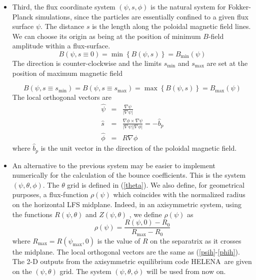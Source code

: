 \documentclass{article}
\begin{document}
\begin{itemize}
\item  Third, the flux coordinate system $\left( \psi ,s,\phi \right) $ is
the natural system for Fokker-Planck simulations, since the particles are
essentially confined to a given flux surface $\psi $. The distance $s$ is
the length along the poloidal magnetic field lines. We can choose its origin
as being at the position of minimum $B$-field amplitude within a
flux-surface. 
\begin{equation}
B\left( \psi ,s\equiv 0\right) =\min \left\{ B\left( \psi ,s\right) \right\}
=B_{\min }\left( \psi \right) 
\end{equation}
The direction is counter-clockwise and the limits $s_{\min }$ and $s_{\max }$
are set at the position of maximum magnetic field

\begin{equation}
B\left( \psi ,s\equiv s_{\min }\right) =B\left( \psi ,s\equiv s_{\max
}\right) =\max \left\{ B\left( \psi ,s\right) \right\} =B_{\max }\left( \psi
\right)   \label{bmax}
\end{equation}
The local orthogonal vectors are 
\begin{eqnarray}
\widehat{\psi } &=&\frac{\nabla \psi }{\left| \nabla \psi \right| }
\label{psih} \\
\widehat{s} &=&\frac{\nabla \phi \times \nabla \psi }{\left| \nabla \psi
\right| \left| \nabla \phi \right| }=-\widehat{b}_{p} \\
\widehat{\phi } &=&R\nabla \phi   \label{phih}
\end{eqnarray}
where $\widehat{b}_{p}$ is the unit vector in the direction of the poloidal
magnetic field.

\item  An alternative to the previous system may be easier to implement
numerically for the calculation of the bounce coefficients. This is the
system $\left( \psi ,\theta ,\phi \right) $. The $\theta $ grid is defined
in (\ref{theta}). We also define, for geometrical purposes, a flux-function $%
\rho \left( \psi \right) $ which coincides with the normalized radius on the
horizontal LFS midplane. Indeed, in an axisymmetric system, using the
functions $R\left( \psi ,\theta \right) $ and $Z\left( \psi ,\theta \right) $%
, we define $\rho \left( \psi \right) $ as 
\[
\rho \left( \psi \right) =\frac{R\left( \psi ,0\right) -R_{0}}{R_{\max
}-R_{0}}
\]
where $R_{\max }=R\left( \psi _{\max },0\right) $ is the value of $R$ on the
separatrix as it crosses the midplane. The local orthogonal vectors are the
same as (\ref{psih}-\ref{phih}). The 2-D outputs from the axisymmetric
equilibrium code HELENA\ are given on the $\left( \psi ,\theta \right) $
grid. The system $\left( \psi ,\theta ,\phi \right) $ will be used from now
on.
\end{itemize}
\end{document}
